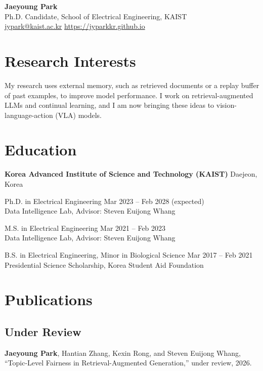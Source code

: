 \documentclass[11pt]{article}
\begin{document}
\begin{center}
{\LARGE\bfseries Jaeyoung Park}\\[1.2ex]
Ph.D. Candidate, School of Electrical Engineering, KAIST\\[0.3ex]
\href{mailto:jypark@kaist.ac.kr}{jypark@kaist.ac.kr} \quad\textbar\quad \href{https://jyparkkr.github.io/}{https://jyparkkr.github.io}
\end{center}

\section{Research Interests}
My research uses external memory, such as retrieved documents or a replay buffer of past examples, to improve model performance.
I work on retrieval-augmented LLMs and continual learning, and I am now bringing these ideas to vision-language-action (VLA) models.

\section{Education}
\textbf{Korea Advanced Institute of Science and Technology (KAIST)} \hfill Daejeon, Korea
\begin{sublist}
\item Ph.D. in Electrical Engineering \hfill Mar 2023 -- Feb 2028 (expected)\\
Data Intelligence Lab, Advisor: Steven Euijong Whang
\item M.S. in Electrical Engineering \hfill Mar 2021 -- Feb 2023\\
Data Intelligence Lab, Advisor: Steven Euijong Whang
\item B.S. in Electrical Engineering, Minor in Biological Science \hfill Mar 2017 -- Feb 2021\\
Presidential Science Scholarship, Korea Student Aid Foundation
\end{sublist}

\section{Publications}

\subsection{Under Review}
\begin{pubs}
\item[{[U1]}] \textbf{Jaeyoung Park}, Hantian Zhang, Kexin Rong, and Steven Euijong Whang, ``Topic-Level Fairness in Retrieval-Augmented Generation,'' under review, 2026.
\end{pubs}
\end{document}
